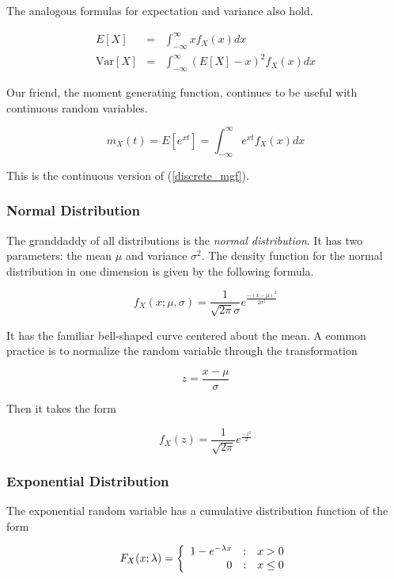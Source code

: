 \documentclass[]{article}
\begin{document}
The analogous formulas for expectation and variance also hold.

\begin{eqnarray}
E[X] & = & \int_{-\infty}^{\infty} xf_X(x) dx \label{cont_mean} \\
\mbox{Var}[X] & = & \int_{-\infty}^{\infty} (E[X] - x)^2 f_X(x) dx \label{cont_var}
\end{eqnarray}

Our friend, the moment generating function, continues to be useful
with continuous random variables.

\begin{equation} \label{cont_mgf}
m_X(t) = E[e^{xt}] = \int_{-\infty}^{\infty} e^{xt} f_X(x) dx
\end{equation}

This is the continuous version of (\ref{discrete_mgf}).

\subsubsection{Normal Distribution}

The granddaddy of all distributions is the \emph{normal distribution}.
It has two parameters: the mean $\mu$ and variance $\sigma^2$.  The
density function for the normal distribution in one dimension is given
by the following formula.

\begin{equation}
f_X(x; \mu, \sigma) = \frac{1}{\sqrt{2\pi}\sigma}e^{\frac{-(x - \mu)^2}{2\sigma^2}}
\end{equation}

It has the familiar bell-shaped curve centered about the mean.
A common practice is to normalize the random variable through
the transformation

$$
z = \frac{x - \mu}{\sigma}
$$

Then it takes the form

\begin{equation}
f_X(z) = \frac{1}{\sqrt{2\pi}}e^\frac{-z^2}{2}
\end{equation}

\subsubsection{Exponential Distribution}

The exponential random variable has a cumulative distribution
function of the form

\begin{equation} \label{exp_cdf}
F_X(x; \lambda) = \left\{ \begin{array}{r@{\quad:\quad}l}
   1 - e^{-\lambda x} & x > 0 \\
   0 & x \le 0
 \end{array} \right.
\end{equation}
\end{document}
